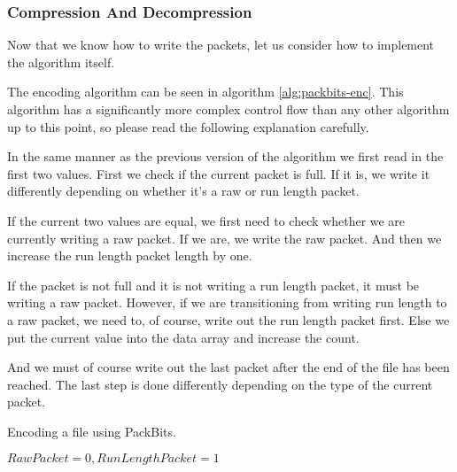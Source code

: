 \begin{refsection}
\subsubsection{Compression And Decompression}
\label{sec:compr-decompr}

Now that we know how to write the packets, let us consider how to
implement the algorithm itself.

The encoding algorithm can be seen in algorithm
\ref{alg:packbits-enc}. This algorithm has a significantly more
complex control flow than any other algorithm up to this point, so please
read the following explanation carefully.

In the same manner as the previous version of the algorithm we first
read in the first two values. First we check if the current packet is
full. If it is, we write it differently depending on whether it's a
raw or run length packet.

If the current two values are equal, we first need to check whether we
are currently writing a raw packet. If we are, we write the raw
packet. And then we increase the run length packet length by one.

If the packet is not full and it is not writing a run length packet,
it must be writing a raw packet. However, if we are transitioning from
writing run length to a raw packet, we need to, of course, write out
the run length packet first. Else we put the current value into the
data array and increase the count.

And we must of course write out the last packet after the end of the
file has been reached. The last step is done differently depending on
the type of the current packet. 

\begin{algorithm}
  \caption{Encoding a file using PackBits.}
  \label{alg:packbits-enc}
  \begin{algorithmic}[1]
    \Require $RawPacket = 0,RunLengthPacket = 1$


    \While{\neof}


            \State {}


\end{algorithmic}
\end{algorithm}
\end{refsection}
